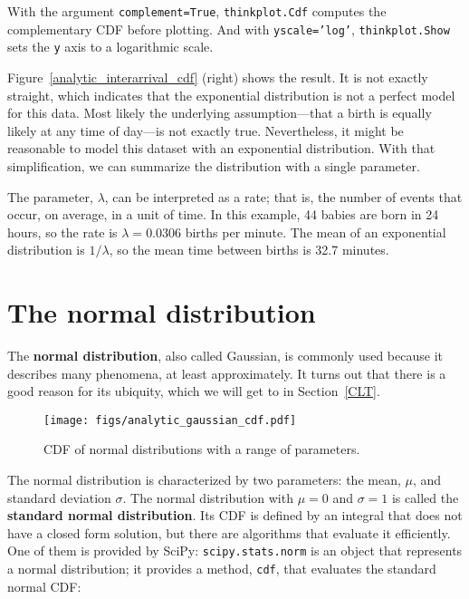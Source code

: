 \documentclass[12pt]{book}
\begin{document}
With the argument {\tt complement=True}, {\tt thinkplot.Cdf} computes
the complementary CDF before plotting.  And with {\tt yscale='log'},
{\tt thinkplot.Show} sets the {\tt y} axis to a logarithmic scale.

Figure~\ref{analytic_interarrival_cdf} (right) shows the result.  It is not
exactly straight, which indicates that the exponential distribution is
not a perfect model for this data.  Most likely the underlying
assumption---that a birth is equally likely at any time of day---is
not exactly true.  Nevertheless, it might be reasonable to model this
dataset with an exponential distribution.  With that simplification, we can
summarize the distribution with a single parameter.

The parameter, $\lambda$, can be interpreted as a rate; that is, the
number of events that occur, on average, in a unit of time.  In this
example, 44 babies are born in 24 hours, so the rate is $\lambda =
0.0306$ births per minute.  The mean of an exponential distribution is
$1/\lambda$, so the mean time between births is 32.7 minutes.


\section{The normal distribution}
\label{normal}

The {\bf normal distribution}, also called Gaussian, is commonly
used because it describes many phenomena, at least approximately.
It turns out that there is a good reason for its ubiquity, which we
will get to in Section~\ref{CLT}.

%
%

\begin{figure}
\centerline{\texttt{[image: figs/analytic\_gaussian\_cdf.pdf]}}
\caption{CDF of normal distributions with a range of parameters.}
\label{analytic_gaussian_cdf}
\end{figure}

The normal distribution is characterized by two parameters: the mean,
$\mu$, and standard deviation $\sigma$.  The normal distribution with
$\mu=0$ and $\sigma=1$ is called the {\bf standard normal
  distribution}.  Its CDF is defined by an integral that does not have
a closed form solution, but there are algorithms that evaluate it
efficiently.  One of them is provided by SciPy: {\tt scipy.stats.norm}
is an object that represents a normal distribution; it provides a
method, {\tt cdf}, that evaluates the standard normal CDF:
\end{document}
